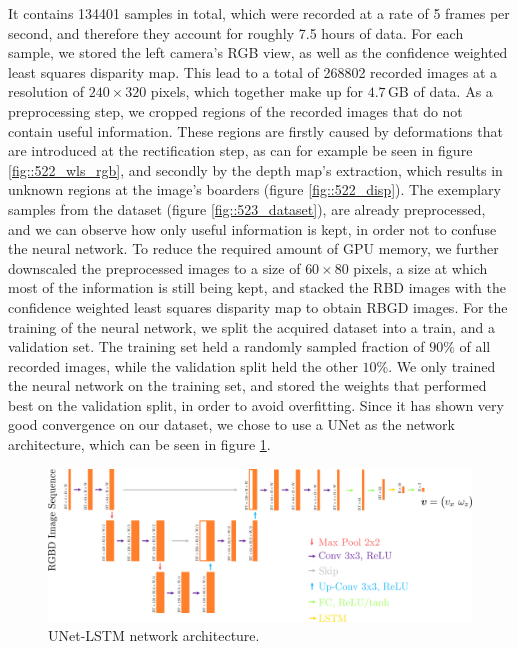 It contains 134401 samples in total, which were recorded at a rate of 5 frames per second, and therefore they account for roughly 7.5 hours of data. For each sample, we stored the left camera's RGB view, as well as the confidence weighted least squares disparity map. This lead to a total of 268802 recorded images at a resolution of $240\times320$ pixels, which together make up for $4.7\,\text{GB}$ of data. As a preprocessing step, we cropped regions of the recorded images that do not contain useful information. These regions are firstly caused by deformations that are introduced at the rectification step, as can for example be seen in figure \ref{fig::522_wls_rgb}, and secondly by the depth map's extraction, which results in unknown regions at the image's boarders (figure \ref{fig::522_disp}). The exemplary samples from the dataset (figure \ref{fig::523_dataset}), are already preprocessed, and we can observe how only useful information is kept, in order not to confuse the neural network. To reduce the required amount of GPU memory, we further downscaled the preprocessed images to a size of $60\times80$ pixels, a size at which most of the information is still being kept, and stacked the RBD images with the confidence weighted least squares disparity map to obtain RBGD images. For the training of the neural network, we split the acquired dataset into a train, and a validation set. The training set held a randomly sampled fraction of $90\%$ of all recorded images, while the validation split held the other $10\%$. We only trained the neural network on the training set, and stored the weights that performed best on the validation split, in order to avoid overfitting. Since it has shown very good convergence on our dataset, we chose to use a UNet \cite{ronneberger2015u} as the network architecture, which can be seen in figure \ref{fig::523_unet}.
\begin{figure}[h]
	\centering
	\includegraphics[scale=.5]{chapters/05_experiments/02_autonomous_walking/unet.png}
	\caption{UNet-LSTM network architecture.}
	\label{fig::523_unet}
\end{figure}
